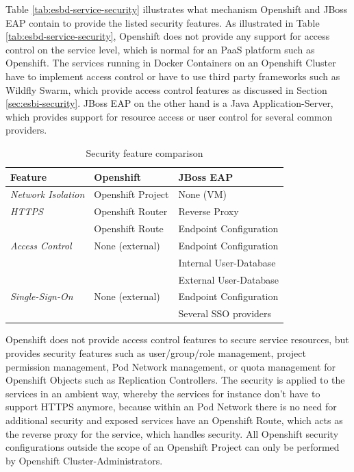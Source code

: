 Table \vref{tab:esbd-service-security} illustrates what mechanism Openshift and JBoss EAP contain to provide the listed security features. As illustrated in Table \vref{tab:esbd-service-security}, Openshift does not provide any support for access control on the service level, which is normal for an PaaS platform such as Openshift. The services running in Docker Containers on an Openshift Cluster have to implement access control or have to use third party frameworks such as Wildfly Swarm, which provide access control features as discussed in Section \vref{sec:esbi-security}. JBoss EAP on the other hand is a Java Application-Server, which provides support for resource access or user control for several common providers. 

{\renewcommand{\arraystretch}{1.2}%
	\begin{table}[h]
		\begin{tabularx}{\textwidth}{ X|X|X }	
			\textbf{Feature}                 & \textbf{Openshift}      & \textbf{JBoss EAP} \\  \hline
			\textit{Network Isolation}       & Openshift Project       & None (VM) \\  \hline
			\textit{HTTPS}                   & Openshift Router        & Reverse Proxy \\
			                                 & Openshift Route         & Endpoint Configuration \\  \hline
            \textit{Access Control}          & None (external)         & Endpoint Configuration \\
                                                                      && Internal User-Database \\ 
                                                                      && External User-Database \\  \hline
            \textit{Single-Sign-On}          & None (external)         & Endpoint Configuration \\
                                                                      && Several SSO providers \\  \hline
		\end{tabularx}
		\caption{Security feature comparison}
		\label{tab:esbd-service-security}
\end{table}}

Openshift does not provide access control features to secure service resources, but provides security features such as user/group/role management, project permission management, Pod Network management, or quota management for Openshift Objects such as Replication Controllers. The security is applied to the services in an ambient way, whereby the services for instance don't have to support HTTPS anymore, because within an Pod Network there is no need for additional security and exposed services have an Openshift Route, which acts as the reverse proxy for the service, which handles security. All Openshift security configurations outside the scope of an Openshift Project can only be performed by Openshift Cluster-Administrators. 
\newpage

